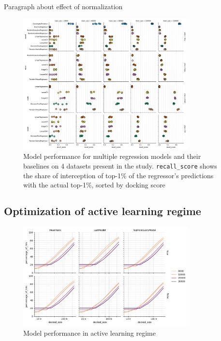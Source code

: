 Paragraph about effect of normalization

\begin{figure}[h]
\centering
\includegraphics[width=0.8\textwidth]{figures/Figure_4.png}
\caption{Model performance for multiple regression models and their baselines on 4 datasets present in the study. \texttt{recall\_score} shows the share of interception of top-1\% of the regressor's predictions with the actual top-1\%, sorted by docking score}
\label{fig:fig_4}
\end{figure}

\subsection{Optimization of active learning regime}



\begin{figure}[h]
\centering
\includegraphics[width=0.8\textwidth]{figures/Figure_3_D4.png}
\caption{Model performance in active learning regime}
\label{fig:fig_3}
\end{figure}

